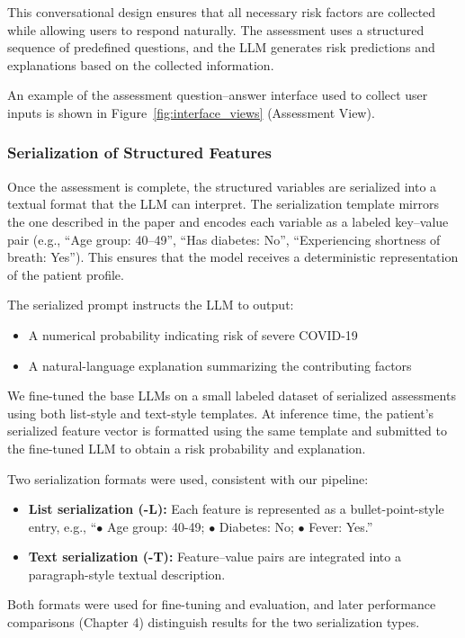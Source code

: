 This conversational design ensures that all necessary risk factors are collected while allowing users to respond naturally. The assessment uses a structured sequence of predefined questions, and the LLM generates risk predictions and explanations based on the collected information.

An example of the assessment question–answer interface used to collect user inputs is shown in Figure~\ref{fig:interface_views} (Assessment View).

\subsubsection{Serialization of Structured Features}
Once the assessment is complete, the structured variables are serialized into a textual format that the LLM can interpret. The serialization template mirrors the one described in the paper and encodes each variable as a labeled key–value pair (e.g., “Age group: 40–49”, “Has diabetes: No”, “Experiencing shortness of breath: Yes”). This ensures that the model receives a deterministic representation of the patient profile.

The serialized prompt instructs the LLM to output:
\begin{itemize}
    \item A numerical probability indicating risk of severe COVID-19
    \item A natural-language explanation summarizing the contributing factors
\end{itemize}
We fine-tuned the base LLMs on a small labeled dataset of serialized assessments using both list-style and text-style templates. At inference time, the patient's serialized feature vector is formatted using the same template and submitted to the fine-tuned LLM to obtain a risk probability and explanation.

Two serialization formats were used, consistent with our pipeline:
\begin{itemize}
    \item \textbf{List serialization (-L):} Each feature is represented as a bullet-point-style entry, e.g., ``$\bullet$ Age group: 40-49; $\bullet$ Diabetes: No; $\bullet$ Fever: Yes.''
    \item \textbf{Text serialization (-T):} Feature--value pairs are integrated into a paragraph-style textual description.
\end{itemize}
Both formats were used for fine-tuning and evaluation, and later performance comparisons (Chapter 4) distinguish results for the two serialization types.

